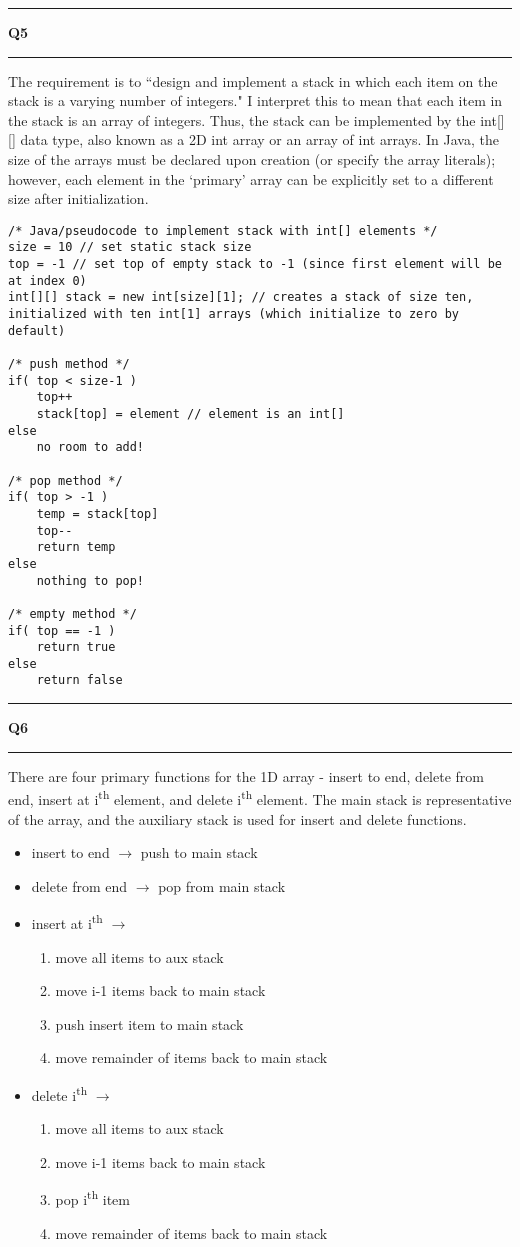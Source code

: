 \documentclass[11pt]{article}
\newcommand\question[2]{\vspace{.25in}\hrule\textbf{#1 #2}\vspace{.5em}\hrule\vspace{.10in}}
\begin{document}
\newpage
\question{Q5}{} 
The requirement is to ``design and implement a stack in which each item on the stack is a varying number of integers." I interpret this to mean that each item in the stack is an array of integers. Thus, the stack can be implemented by the int[][] data type, also known as a 2D int array or an array of int arrays. In Java, the size of the arrays must be declared upon creation (or specify the array literals); however, each element in the `primary' array can be explicitly set to a different size after initialization.
\begin{lstlisting}
/* Java/pseudocode to implement stack with int[] elements */
size = 10 // set static stack size
top = -1 // set top of empty stack to -1 (since first element will be at index 0)
int[][] stack = new int[size][1]; // creates a stack of size ten, initialized with ten int[1] arrays (which initialize to zero by default)

/* push method */
if( top < size-1 )
	top++
	stack[top] = element // element is an int[]
else
	no room to add!

/* pop method */
if( top > -1 )
	temp = stack[top]
	top--
	return temp
else
	nothing to pop!

/* empty method */
if( top == -1 )
	return true
else
	return false
\end{lstlisting}

\newpage
\question{Q6}{} 
There are four primary functions for the 1D array - insert to end, delete from end, insert at i\textsuperscript{th} element, and delete  i\textsuperscript{th} element. The main stack is representative of the array, and the auxiliary stack is used for insert and delete functions. 
\begin{itemize}
	\item insert to end $\rightarrow$ push to main stack
	\item delete from end $\rightarrow$ pop from main stack
	\item insert at i\textsuperscript{th} $\rightarrow$
		\begin{enumerate}
			\item move all items to aux stack
			\item move i-1 items back to main stack
			\item push insert item to main stack
			\item move remainder of items back to main stack
		\end{enumerate}
	\item delete  i\textsuperscript{th}  $\rightarrow$
		\begin{enumerate}
			\item move all items to aux stack
			\item move i-1 items back to main stack
			\item pop  i\textsuperscript{th} item
			\item move remainder of items back to main stack
		\end{enumerate}
\end{itemize}
\end{document}
